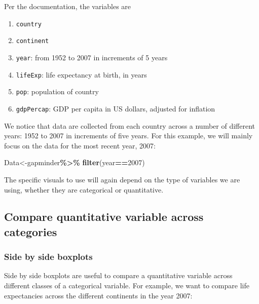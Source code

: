 \documentclass[
]{book}
\newenvironment{Shaded}{\begin{snugshade}}{\end{snugshade}}
\newcommand{\DecValTok}[1]{\textcolor[rgb]{0.00,0.00,0.81}{#1}}
\newcommand{\FunctionTok}[1]{\textcolor[rgb]{0.13,0.29,0.53}{\textbf{#1}}}
\newcommand{\NormalTok}[1]{#1}
\newcommand{\OtherTok}[1]{\textcolor[rgb]{0.56,0.35,0.01}{#1}}
\newcommand{\SpecialCharTok}[1]{\textcolor[rgb]{0.81,0.36,0.00}{\textbf{#1}}}
\providecommand{\tightlist}{%
  \setlength{\itemsep}{0pt}\setlength{\parskip}{0pt}}
\begin{document}
Per the documentation, the variables are

\begin{enumerate}
\def\labelenumi{\arabic{enumi}.}
\tightlist
\item
  \texttt{country}
\item
  \texttt{continent}
\item
  \texttt{year}: from 1952 to 2007 in increments of 5 years
\item
  \texttt{lifeExp}: life expectancy at birth, in years
\item
  \texttt{pop}: population of country
\item
  \texttt{gdpPercap}: GDP per capita in US dollars, adjusted for inflation
\end{enumerate}

We notice that data are collected from each country across a number of different years: 1952 to 2007 in increments of five years. For this example, we will mainly focus on the data for the most recent year, 2007:

\begin{Shaded}
\begin{Highlighting}[]
\NormalTok{Data}\OtherTok{\textless{}{-}}\NormalTok{gapminder}\SpecialCharTok{\%\textgreater{}\%}
  \FunctionTok{filter}\NormalTok{(year}\SpecialCharTok{==}\DecValTok{2007}\NormalTok{)}
\end{Highlighting}
\end{Shaded}

The specific visuals to use will again depend on the type of variables we are using, whether they are categorical or quantitative.

\hypertarget{compare-quantitative-variable-across-categories}{%
\subsection{Compare quantitative variable across categories}\label{compare-quantitative-variable-across-categories}}

\hypertarget{side-by-side-boxplots}{%
\subsubsection{Side by side boxplots}\label{side-by-side-boxplots}}

Side by side boxplots are useful to compare a quantitative variable across different classes of a categorical variable. For example, we want to compare life expectancies across the different continents in the year 2007:
\end{document}
